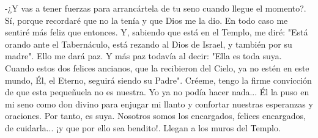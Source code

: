 \documentclass[12pt]{book} %
\begin{document}
-¿Y vas a tener fuerzas para arrancártela de tu seno cuando llegue el momento?. 
Sí, porque recordaré que no la tenía y que Dios me la dio. En todo caso me sentiré más feliz que entonces. Y, sabiendo 
que está en el Templo, me diré: "Está orando ante el Tabernáculo, está rezando al Dios de Israel, y también por su madre". Ello me dará paz. Y más paz todavía al decir: "Ella es toda suya. Cuando estos dos felices ancianos, que la recibieron del Cielo, ya no estén en este mundo, Él, el Eterno, seguirá siendo su Padre". Créeme, tengo la firme convicción de que esta pequeñuela no es nuestra. Yo ya no podía hacer nada... Él la puso en mi seno como don divino para enjugar mi llanto y confortar nuestras esperanzas y oraciones. Por tanto, es suya. Nosotros somos los encargados, felices encargados, de cuidarla... ¡y que por ello sea bendito!. 
Llegan a los muros del Templo. 
 
\end{document}
